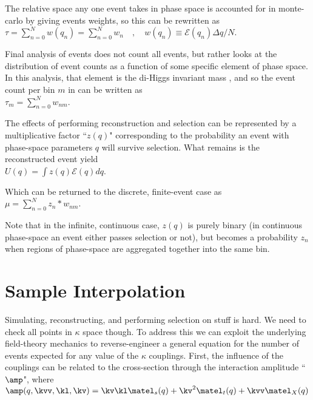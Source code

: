     The relative space any one event takes in phase space is accounted for in monte-carlo by giving events weights, so this can be rewritten as\\
    $\tau = \sum\limits_{n=0}^{N} w(q_n) = \sum\limits_{n=0}^{N} w_n \quad,\quad w(q_n) \equiv \mathscr{E}(q_n) \Delta q / N $.

    Final analysis of events does not count all events, but rather looks at the distribution of event counts as a function of some specific element of phase space.
    In this analysis, that element is the di-Higgs invariant mass \mhh, and so the event count per bin $m$ in \mhh can be written as\\
    $\tau_m = \sum\limits_{n=0}^{N} w_{nm} $. 

    The effects of performing reconstruction and selection can be represented by a multiplicative factor ``$z(q)$" corresponding to the probability an event with phase-space parameters $q$ will survive selection.
    What remains is the reconstructed event yield\\
    $U(q) = \int z(q) \mathscr{E}(q) dq $.

    Which can be returned to the discrete, finite-event case as\\
    $\mu = \sum\limits_{n=0}^{N} z_n * w_{nm} $.

    Note that in the infinite, continuous case, $z(q)$ is purely binary (in continuous phase-space an event either passes selection or not),
        but becomes a probability $z_n$ when regions of phase-space are aggregated together into the same bin.


\section{Sample Interpolation}

    Simulating, reconstructing, and performing selection on stuff is hard.
    We need to check all points in $\kappa$ space though.
    To address this we can exploit the underlying field-theory mechanics to reverse-engineer a general equation for the number of events expected for any value of the $\kappa$ couplings.
    First, the influence of the couplings can be related to the cross-section through the interaction amplitude ``$\amp$", where\\
    $\amp(q,\kvv,\kl,\kv) =  \kv \kl \matel_s(q) + \kv^2 \matel_t(q) + \kvv \matel_X(q) $

